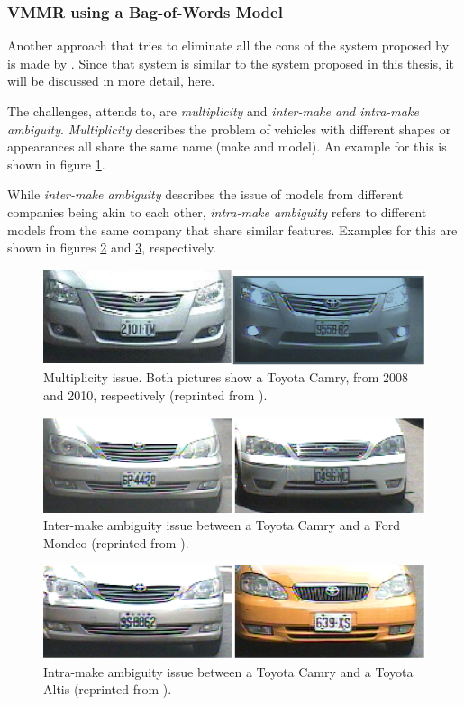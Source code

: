 \subsubsection{VMMR using a Bag-of-Words Model}
Another approach that tries to eliminate all the cons of the system proposed by \citeauthor{petrovic2004analysis} is made by \citeauthor{siddiqui2015robust} \citep{siddiqui2015robust}. Since that system is similar to the system proposed in this thesis, it will be discussed in more detail, here.

The challenges, \citep{siddiqui2015robust} attends to, are \emph{multiplicity} and \emph{inter-make and intra-make ambiguity}. \emph{Multiplicity} describes the problem of vehicles with different shapes or appearances all share the same name (make and model). An example for this is shown in figure \ref{fig:vmmrMultiplicity}.

While \emph{inter-make ambiguity} describes the issue of models from different companies being akin to each other, \emph{intra-make ambiguity} refers to different models from the same company that share similar features. Examples for this are shown in figures \ref{fig:vmmrAmbiguityInterMake} and \ref{fig:vmmrAmbiguityIntraMake}, respectively.

\begin{figure}[bth]
  \centering
        \includegraphics[width=.75\linewidth]{gfx/multiplicity_reprint}
        \caption{Multiplicity issue. Both pictures show a Toyota Camry, from 2008 and 2010, respectively (reprinted from \citep{siddiqui2015robust}).}
        \label{fig:vmmrMultiplicity}
\end{figure}
\begin{figure}[bth]
  \centering
        \includegraphics[width=.75\linewidth]{gfx/ambiguity_intermake_reprint}
        \caption{Inter-make ambiguity issue between a Toyota Camry and a Ford Mondeo (reprinted from \citep{siddiqui2015robust}).}
        \label{fig:vmmrAmbiguityInterMake}
\end{figure}
\begin{figure}[bth]
  \centering
        \includegraphics[width=.75\linewidth]{gfx/ambiguity_intramake_reprint}
        \caption{Intra-make ambiguity issue between a Toyota Camry and a Toyota Altis (reprinted from \citep{siddiqui2015robust}).}
        \label{fig:vmmrAmbiguityIntraMake}
\end{figure}

